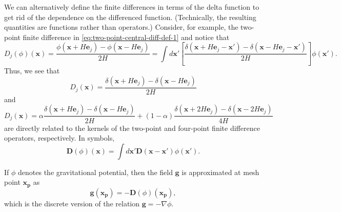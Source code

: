 We can alternatively define the finite differences in terms of the delta function to get rid of the dependence on the differenced function. (Technically, the resulting quantities are functions rather than operators.)
Consider, for example, the two-point finite difference in \autoref{eq:two-point-central-diff-def-1} and notice that
\begin{equation*}
    D_j(\phi)(\mathbf{x}) = \frac{\phi(\mathbf{x} + H \mathbf{e}_j)-\phi (\mathbf{x} - H \mathbf{e}_j)}{2H} = \int d\mathbf{x}' \left[ \frac{\delta(\mathbf{x} + H\mathbf{e}_j - \mathbf{x}') - \delta(\mathbf{x} - H\mathbf{e}_j - \mathbf{x}')}{2H} \right]\phi(\mathbf{x}').
\end{equation*}
Thus, we see that
\begin{equation}\label{eq:two-point-central-diff}
    D_j(\mathbf{x}) = \frac{\delta(\mathbf{x} + H\mathbf{e}_j) - \delta(\mathbf{x} - H\mathbf{e}_j)}{2H}
\end{equation}
and
\begin{equation}\label{eq:four-point-central-diff}
    D_j(\mathbf{x}) = \alpha\frac{\delta(\mathbf{x} + H\mathbf{e}_j) - \delta(\mathbf{x} - H\mathbf{e}_j)}{2H} + (1-\alpha)\frac{\delta(\mathbf{x} + 2H\mathbf{e}_j) - \delta(\mathbf{x} - 2H\mathbf{e}_j)}{4H}
\end{equation}
are directly related to the kernels of the two-point and four-point finite difference operators, respectively.
In symbols,
\begin{equation*}
    \mathbf{D}(\phi)(\mathbf{x}) = \int d\mathbf{x}' \mathbf{D}(\mathbf{x} - \mathbf{x}')\phi(\mathbf{x}').
\end{equation*}

If $\phi$ denotes the gravitational potential, then the field $\mathbf{g}$ is approximated at mesh point $\mathbf{x}_\mathbf{p}$ as
\begin{equation*}
    \mathbf{g}(\mathbf{x}_\mathbf{p}) = -\mathbf{D}(\phi)(\mathbf{x}_\mathbf{p}),
\end{equation*}
which is the discrete version of the relation $\mathbf{g} = -\nabla \phi$.
